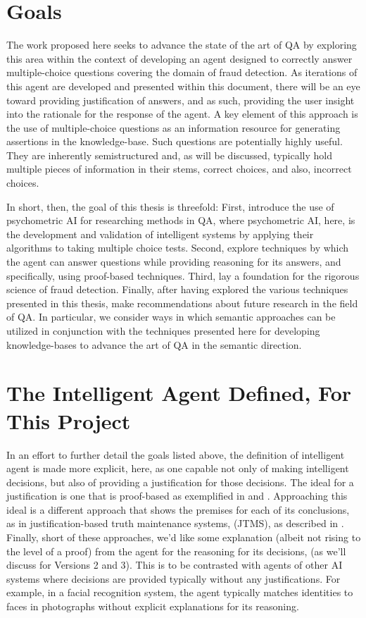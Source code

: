 \section{Goals}

The work proposed here seeks to advance the state of the art of QA by exploring this area within the context of developing an agent designed to correctly answer multiple-choice questions covering the domain of fraud detection.  As iterations of this agent are developed and presented within this document, there will be an eye toward providing justification of answers, and as such, providing the user insight into the rationale for the response of the agent. A key element of this approach is the use of multiple-choice questions as an information resource for generating assertions in the knowledge-base.  Such questions are potentially highly useful.  They are inherently semistructured and, as will be discussed, typically hold multiple pieces of information in their stems, correct choices, and also, incorrect choices.

In short, then, the goal of this thesis is threefold:  First, introduce the use of psychometric AI \cite{psychoai.ijcai03} for researching methods in QA, where psychometric AI, here, is the development and validation of intelligent systems by applying their algorithms to taking multiple choice tests.  Second, explore techniques by which the agent can answer questions while providing reasoning for its answers, and specifically, using proof-based techniques.  Third, lay a foundation for the rigorous science of fraud detection.  Finally, after having explored the various techniques presented in this thesis, make recommendations about future research in the field of QA.  In particular, we consider ways in which semantic approaches can be utilized in conjunction with the techniques presented here for developing knowledge-bases to advance the art of QA in the semantic direction.

\section{The Intelligent Agent Defined, For This Project}
In an effort to further detail the goals listed above, the definition of intelligent agent is made more explicit, here, as one capable not only of making intelligent decisions, but also of providing a justification for those decisions.  The ideal for a justification is one that is proof-based as exemplified in \cite{bringsjord2015logicist} and \cite{johnson2014three}.  Approaching this ideal is a different approach that shows the premises for each of its conclusions, as in justification-based truth maintenance systems, (JTMS), as described in \cite{russell_norvig_2010_sect12.6}. Finally, short of these approaches, we'd like some explanation (albeit not rising to the level of a proof) from the agent for the reasoning for its decisions, (as we'll discuss for Versions 2 and 3).  This is to be contrasted with agents of other AI systems where decisions are provided typically without any justifications.  For example, in a facial recognition system, the agent typically matches identities to faces in photographs without explicit explanations for its reasoning.  

